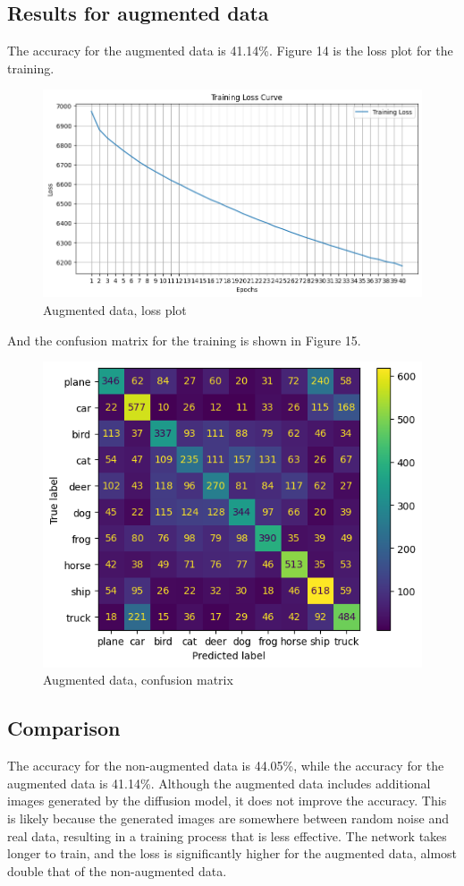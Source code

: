 \documentclass[conference]{IEEEtran}
\begin{document}
\subsection{Results for augmented data}
The accuracy for the augmented data is 41.14\%. Figure 14 is the loss plot for the training.
\begin{figure}[!h]
  \centering
  \includegraphics[scale=0.4]{./images/output/loss2.png}
  \caption{Augmented data, loss plot}
\end{figure}

And the confusion matrix for the training is shown in Figure 15.
\begin{figure}[!h]
  \centering
  \includegraphics[scale=0.5]{./images/output/train2.png}
  \caption{Augmented data, confusion matrix}
\end{figure}

\subsection{Comparison}
The accuracy for the non-augmented data is 44.05\%, while the accuracy for the augmented data is 41.14\%. 
Although the augmented data includes additional images generated by the diffusion model, 
it does not improve the accuracy. This is likely because the generated images are somewhere between random noise and real data, resulting in a training process that is less effective. The network takes longer to train, and the loss is significantly higher for the augmented data, almost double that of the non-augmented data. 
\end{document}
